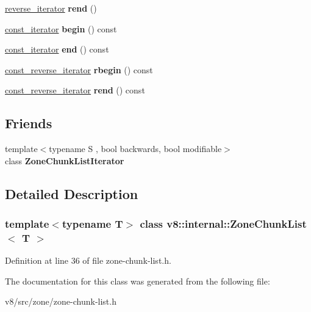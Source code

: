 \begin{DoxyCompactItemize}
\mbox{\hyperlink{classv8_1_1internal_1_1ZoneChunkListIterator}{reverse\+\_\+iterator}} {\bfseries rend} ()
\item 
\mbox{\label{classv8_1_1internal_1_1ZoneChunkList_a9157c14fba8e1ed4c5dba71ad6dc523f}} 
\mbox{\hyperlink{classv8_1_1internal_1_1ZoneChunkListIterator}{const\+\_\+iterator}} {\bfseries begin} () const
\item 
\mbox{\label{classv8_1_1internal_1_1ZoneChunkList_a23209c952148b1fd8884e55789a70b1f}} 
\mbox{\hyperlink{classv8_1_1internal_1_1ZoneChunkListIterator}{const\+\_\+iterator}} {\bfseries end} () const
\item 
\mbox{\label{classv8_1_1internal_1_1ZoneChunkList_ad1f2fa9d0a85c255fed42605a3939025}} 
\mbox{\hyperlink{classv8_1_1internal_1_1ZoneChunkListIterator}{const\+\_\+reverse\+\_\+iterator}} {\bfseries rbegin} () const
\item 
\mbox{\label{classv8_1_1internal_1_1ZoneChunkList_adba4a76d4efde7cb271281f4b1d92eac}} 
\mbox{\hyperlink{classv8_1_1internal_1_1ZoneChunkListIterator}{const\+\_\+reverse\+\_\+iterator}} {\bfseries rend} () const
\end{DoxyCompactItemize}
\subsection*{Friends}
\begin{DoxyCompactItemize}
\item 
\mbox{\label{classv8_1_1internal_1_1ZoneChunkList_aadb999f6c7ceb0e3c94ab892e1bce6dd}} 
{\footnotesize template$<$typename S , bool backwards, bool modifiable$>$ }\\class {\bfseries Zone\+Chunk\+List\+Iterator}
\end{DoxyCompactItemize}


\subsection{Detailed Description}
\subsubsection*{template$<$typename T$>$\newline
class v8\+::internal\+::\+Zone\+Chunk\+List$<$ T $>$}



Definition at line 36 of file zone-\/chunk-\/list.\+h.



The documentation for this class was generated from the following file\+:\begin{DoxyCompactItemize}
\item 
v8/src/zone/zone-\/chunk-\/list.\+h\end{DoxyCompactItemize}
